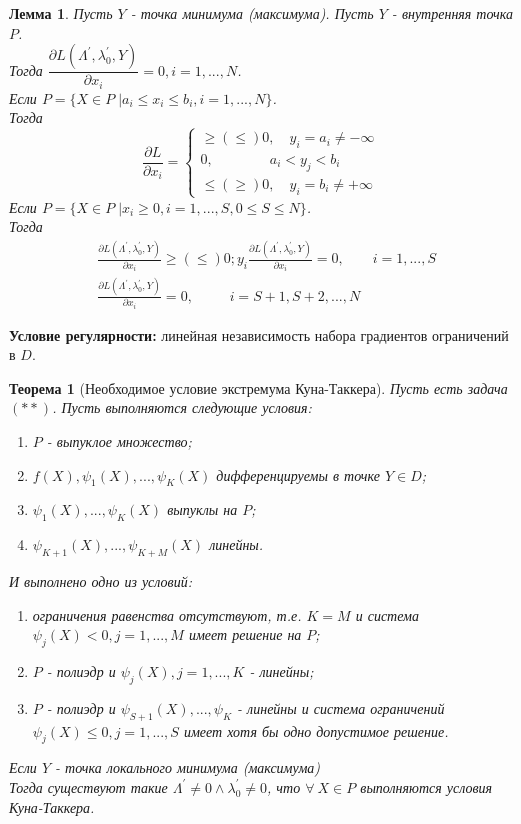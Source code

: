 \documentclass[12pt]{article}
\newtheorem{lemma}{Лемма}[section]
\newtheorem{theorem}{Теорема}[section]
\theoremstyle{definition}
\theoremstyle{remark}
\begin{document}
\begin{lemma}
  Пусть $Y$ - точка минимума (максимума). Пусть $Y$ - внутренняя точка $P$.\\
  Тогда $\dfrac{\partial L(\Lambda^{'},\lambda_0^{'},Y)}{\partial x_i}=0, i=1,...,N$.\\
  Если $P=\bigg\{X\in P\;\bigg| a_i\leqslant x_i \leqslant b_i, i=1,...,N \bigg\}$.\\
  Тогда
  \begin{equation}
    \frac{\partial L}{\partial x_i}=\begin{cases}
      \geqslant (\leqslant) 0,\quad y_i=a_i\neq -\infty\\
      0,\quad\quad\quad\quad a_i< y_j< b_i\\
      \leqslant (\geqslant) 0,\quad y_i=b_i\neq +\infty
    \end{cases}
  \end{equation}
  Если $P=\bigg\{X\in P\;\bigg| x_i \geqslant 0, i=1,...,S, 0\leqslant S \leqslant N \bigg\}$.\\
  Тогда
  \begin{align}
    &\frac{\partial L(\Lambda^{'},\lambda_0^{'},Y)}{\partial x_i}\geqslant (\leqslant) 0; y_i\frac{\partial L(\Lambda^{'},\lambda_0^{'},Y)}{\partial x_i}=0,\qquad i=1,...,S\\
    &\frac{\partial L(\Lambda^{'},\lambda_0^{'},Y)}{\partial x_i}=0,\qquad\;\; i=S+1,S+2,...,N
  \end{align}
\end{lemma}
\textbf{Условие регулярности:} линейная независимость набора градиентов ограничений в $D$.
\begin{theorem}[Необходимое условие экстремума Куна-Таккера]
  Пусть есть задача $(**)$. Пусть выполняются следующие условия:
  \begin{enumerate}
    \item $P$ - выпуклое множество;
    \item $f(X),\psi_1(X),...,\psi_K(X)$ дифференцируемы в точке $Y\in D$;
    \item $\psi_1(X),...,\psi_K(X)$ выпуклы на $P$;
    \item $\psi_{K+1}(X),...,\psi_{K+M}(X)$ линейны.
  \end{enumerate}
  И выполнено одно из условий:
  \begin{enumerate}
    \item[a)] ограничения равенства отсутствуют, т.е. $K=M$ и система $\psi_j(X)<0,j=1,...,M$ имеет решение на $P$;
    \item[b)] $P$ - полиэдр и $\psi_j(X),j=1,...,K$ - линейны;
    \item[c)] $P$ - полиэдр и $\psi_{S+1}(X),...,\psi_K$ - линейны и система ограничений $\psi_j(X)\leqslant 0,j=1,...,S$ имеет хотя бы одно допустимое решение.
  \end{enumerate}
  Если $Y$ - точка локального минимума (максимума)\\
  Тогда существуют такие $\Lambda^{'}\neq 0 \land \lambda_0^{'}\neq 0$, что $\forall\:X\in P $ выполняются условия Куна-Таккера.
\end{theorem}
\end{document}

